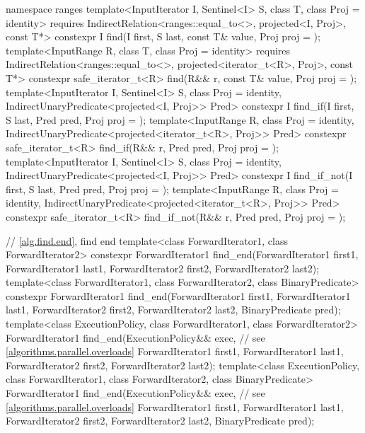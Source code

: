 \begin{codeblock}
{  namespace ranges {
    template<InputIterator I, Sentinel<I> S, class T, class Proj = identity>
      requires IndirectRelation<ranges::equal_to<>, projected<I, Proj>, const T*>
        constexpr I find(I first, S last, const T& value, Proj proj = {});
    template<InputRange R, class T, class Proj = identity>
      requires IndirectRelation<ranges::equal_to<>, projected<iterator_t<R>, Proj>, const T*>
      constexpr safe_iterator_t<R>
        find(R&& r, const T& value, Proj proj = {});
    template<InputIterator I, Sentinel<I> S, class Proj = identity,
        IndirectUnaryPredicate<projected<I, Proj>> Pred>
      constexpr I find_if(I first, S last, Pred pred, Proj proj = {});
    template<InputRange R, class Proj = identity,
        IndirectUnaryPredicate<projected<iterator_t<R>, Proj>> Pred>
      constexpr safe_iterator_t<R>
        find_if(R&& r, Pred pred, Proj proj = {});
    template<InputIterator I, Sentinel<I> S, class Proj = identity,
        IndirectUnaryPredicate<projected<I, Proj>> Pred>
      constexpr I find_if_not(I first, S last, Pred pred, Proj proj = {});
    template<InputRange R, class Proj = identity,
        IndirectUnaryPredicate<projected<iterator_t<R>, Proj>> Pred>
      constexpr safe_iterator_t<R>
        find_if_not(R&& r, Pred pred, Proj proj = {});
  }

  // \ref{alg.find.end}, find end
  template<class ForwardIterator1, class ForwardIterator2>
    constexpr ForwardIterator1
      find_end(ForwardIterator1 first1, ForwardIterator1 last1,
               ForwardIterator2 first2, ForwardIterator2 last2);
  template<class ForwardIterator1, class ForwardIterator2, class BinaryPredicate>
    constexpr ForwardIterator1
      find_end(ForwardIterator1 first1, ForwardIterator1 last1,
               ForwardIterator2 first2, ForwardIterator2 last2,
               BinaryPredicate pred);
  template<class ExecutionPolicy, class ForwardIterator1, class ForwardIterator2>
    ForwardIterator1
      find_end(ExecutionPolicy&& exec, // see \ref{algorithms.parallel.overloads}
               ForwardIterator1 first1, ForwardIterator1 last1,
               ForwardIterator2 first2, ForwardIterator2 last2);
  template<class ExecutionPolicy, class ForwardIterator1,
           class ForwardIterator2, class BinaryPredicate>
    ForwardIterator1
      find_end(ExecutionPolicy&& exec, // see \ref{algorithms.parallel.overloads}
               ForwardIterator1 first1, ForwardIterator1 last1,
               ForwardIterator2 first2, ForwardIterator2 last2,
               BinaryPredicate pred);

}
\end{codeblock}
